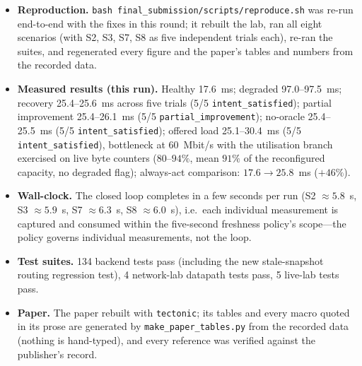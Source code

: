\documentclass[11pt,a4paper]{article}
\begin{document}
\begin{itemize}
  \item \textbf{Reproduction.} \texttt{bash final\_submission/scripts/reproduce.sh}
    was re-run end-to-end with the fixes in this round; it rebuilt the lab,
    ran all eight scenarios (with S2, S3, S7, S8 as five independent trials
    each), re-ran the suites, and regenerated every figure and the paper's
    tables and numbers from the recorded data.
  \item \textbf{Measured results (this run).} Healthy 17.6~ms; degraded
    97.0--97.5~ms; recovery 25.4--25.6~ms across five trials (5/5
    \texttt{intent\_satisfied}); partial improvement 25.4--26.1~ms (5/5
    \texttt{partial\_improvement}); no-oracle 25.4--25.5~ms (5/5
    \texttt{intent\_satisfied}); offered load 25.1--30.4~ms (5/5
    \texttt{intent\_satisfied}), bottleneck at 60~Mbit/s with the
    utilisation branch exercised on live byte counters ($80$--$94\%$, mean
    $91\%$ of the reconfigured capacity, no degraded flag); always-act
    comparison: $17.6 \rightarrow 25.8$~ms ($+46\%$).
  \item \textbf{Wall-clock.} The closed loop completes in a few seconds per
    run (S2 $\approx 5.8$~s, S3 $\approx 5.9$~s, S7 $\approx 6.3$~s,
    S8 $\approx 6.0$~s), i.e.\ each individual measurement is captured and
    consumed within the five-second freshness policy's scope---the policy
    governs individual measurements, not the loop.
  \item \textbf{Test suites.} 134 backend tests pass (including the new
    stale-snapshot routing regression test), 4
    network-lab datapath tests pass, 5 live-lab tests pass.
  \item \textbf{Paper.} The paper rebuilt with \texttt{tectonic}; its
    tables and every macro quoted in its prose are generated by
    \texttt{make\_paper\_tables.py} from the recorded data (nothing is
    hand-typed), and every reference was verified against the publisher's
    record.
\end{itemize}
\end{document}
